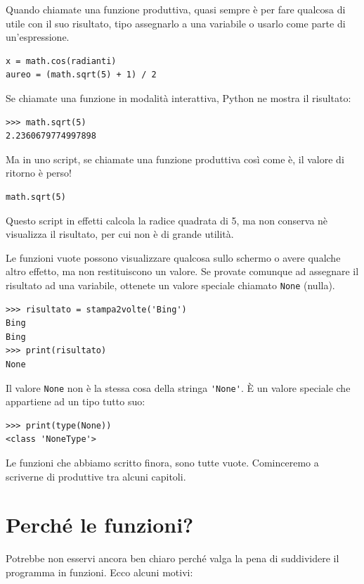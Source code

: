 \documentclass[10pt]{book}
\begin{document}
Quando chiamate una funzione produttiva, quasi sempre è per fare qualcosa di utile con il suo risultato, tipo assegnarlo a una variabile o usarlo come parte di un'espressione.

\begin{verbatim}
x = math.cos(radianti)
aureo = (math.sqrt(5) + 1) / 2
\end{verbatim}
%
Se chiamate una funzione in modalità interattiva, Python ne mostra il risultato:

\begin{verbatim}
>>> math.sqrt(5)
2.2360679774997898
\end{verbatim}
%
Ma in uno script, se chiamate una funzione produttiva così come è, il valore di ritorno è perso!

\begin{verbatim}
math.sqrt(5)
\end{verbatim}
%
Questo script in effetti calcola la radice quadrata di 5, ma non conserva nè visualizza il risultato, per cui non è di grande utilità.

Le funzioni vuote possono visualizzare qualcosa sullo schermo o avere qualche altro effetto, ma non restituiscono un valore. Se provate comunque ad assegnare il risultato ad una variabile, ottenete un valore speciale chiamato
{\tt None} (nulla).

\begin{verbatim}
>>> risultato = stampa2volte('Bing')
Bing
Bing
>>> print(risultato)
None
\end{verbatim}
%
Il valore {\tt None} non è la stessa cosa della stringa \verb"'None'". 
È un valore speciale che appartiene ad un tipo tutto suo:

\begin{verbatim}
>>> print(type(None))
<class 'NoneType'>
\end{verbatim}
%
Le funzioni che abbiamo scritto finora, sono tutte vuote. Cominceremo a scriverne di produttive tra alcuni capitoli.


\section{Perché le funzioni?}

Potrebbe non esservi ancora ben chiaro perché valga la pena di suddividere il programma in funzioni. Ecco alcuni motivi:
\end{document}
